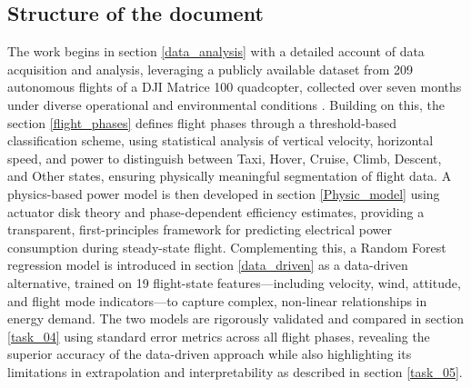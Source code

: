 \subsection{Structure of the document}
The work begins in section \ref{data_analysis} with a detailed account of data acquisition and analysis, leveraging a publicly available dataset from 209 autonomous flights of a DJI Matrice 100 quadcopter, collected over seven months under diverse operational and environmental conditions \cite{rodrigues2021}. Building on this, the section \ref{flight_phases} defines flight phases through a threshold-based classification scheme, using statistical analysis of vertical velocity, horizontal speed, and power to distinguish between Taxi, Hover, Cruise, Climb, Descent, and Other states, ensuring physically meaningful segmentation of flight data. A physics-based power model is then developed in section \ref{Physic_model} using actuator disk theory and phase-dependent efficiency estimates, providing a transparent, first-principles framework for predicting electrical power consumption during steady-state flight. Complementing this, a Random Forest regression model is introduced in section \ref{data_driven} as a data-driven alternative, trained on 19 flight-state features—including velocity, wind, attitude, and flight mode indicators—to capture complex, non-linear relationships in energy demand. The two models are rigorously validated and compared in section \ref{task_04} using standard error metrics across all flight phases, revealing the superior accuracy of the data-driven approach while also highlighting its limitations in extrapolation and interpretability as described in section \ref{task_05}. 

